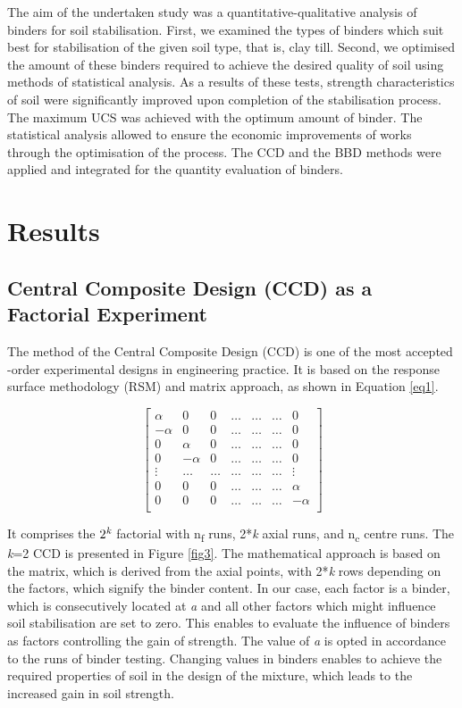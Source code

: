 \documentclass[eprint,
]{actapoly}
\begin{document}
The aim of the undertaken study was a quantitative-qualitative analysis of binders for soil stabilisation. First, we examined the types of binders which suit best for stabilisation of the given soil type, that is, clay till. Second, we optimised the amount of these binders required to achieve the desired quality of soil using methods of statistical analysis. As a results of these tests, strength characteristics of soil were significantly improved upon completion of the stabilisation process. The maximum UCS was achieved with the optimum amount of binder. The statistical analysis allowed to ensure the economic improvements of works through the optimisation of the process. The CCD and the BBD methods were applied and integrated for the quantity evaluation of binders.

\section{Results}
\subsection{Central Composite Design (CCD) as a Factorial Experiment}
The method of the Central Composite Design (CCD) is one of the most accepted -order experimental designs in engineering practice. It is based on the response surface methodology (RSM) \cite{Montgomery2019} and matrix approach, as shown in Equation \ref{eq1}. 

\begin{equation}\label{eq1}
\begin{bmatrix}
\alpha & 0 & 0 & \ldots & \ldots & \ldots & 0 \\
-\alpha & 0 & 0 & \ldots & \ldots & \ldots & 0 \\
0 & \alpha & 0 & \ldots & \ldots & \ldots & 0 \\
0 & -\alpha & 0 & \ldots & \ldots & \ldots & 0 \\
\vdots & \ldots & \ldots & \ldots & \ldots & \ldots & \vdots \\
0 & 0 & 0 & \ldots & \ldots & \ldots & \alpha \\
0 & 0 & 0 & \ldots & \ldots & \ldots & -\alpha \\
\end{bmatrix}
\end{equation}

It comprises the $2^\emph{k}$ factorial with n\textsubscript{f} runs, 2*\emph{k} axial runs, and n\textsubscript{c} centre runs. The \emph{k}=2 CCD is presented in Figure \ref{fig3}. The mathematical approach is based on the matrix, which is derived from the axial points, with 2*\emph{k} rows depending on the factors, which signify the binder content. In our case, each factor is a binder, which is consecutively located at \emph{a} and all other factors which might influence soil stabilisation are set to zero. This enables to evaluate the influence of binders as factors controlling the gain of strength. The value of \emph{a} is opted in accordance to the runs of binder testing. Changing values in binders enables to achieve the required properties of soil in the design of the mixture, which leads to the increased gain in soil strength.
\end{document}
